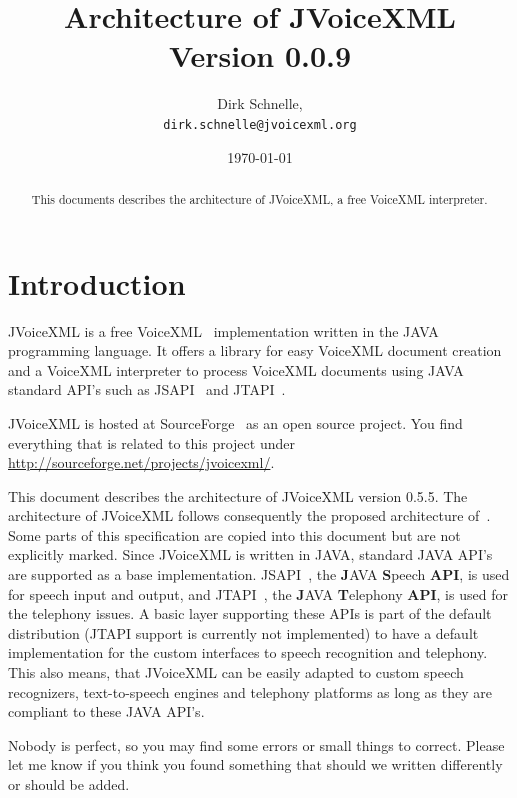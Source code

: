 \documentclass[11pt,a4paper]{article}
\title{Architecture of JVoiceXML \\
Version 0.0.9}
\author{Dirk Schnelle,  \\
  \texttt{dirk.schnelle@jvoicexml.org} }
\date{\today}
\begin{document}
\pagestyle{headings}

\maketitle

\begin{abstract}
This documents describes the architecture of JVoiceXML, a free
VoiceXML interpreter.
\end{abstract}

\tableofcontents

\section{Introduction}
\label{sec:introduction}

JVoiceXML is a free VoiceXML~\cite{w3.org:voicexml} implementation written in 
the JAVA programming language. It offers a library for easy VoiceXML
document creation and a VoiceXML interpreter to process 
VoiceXML documents using JAVA standard API's such as JSAPI~\cite{sun:jsapi} and
JTAPI~\cite{sun:jtapi}.

JVoiceXML is hosted at SourceForge~\cite{sourceforge} as an open source 
project.
You find everything that is related to this project under
\url{http://sourceforge.net/projects/jvoicexml/}.

This document describes the architecture of JVoiceXML version 0.5.5. The
architecture of JVoiceXML follows
consequently the proposed architecture of~\cite{w3.org:voicexml}.
Some parts of this specification are copied into this document
but are not explicitly marked.
Since JVoiceXML is written in JAVA, standard JAVA API's are supported as a base
implementation. JSAPI~\cite{sun:jsapi}, the \textbf{J}AVA \textbf{S}peech
\textbf{API}, is used for speech input and output,
and JTAPI~\cite{sun:jtapi}, the \textbf{J}AVA \textbf{T}elephony \textbf{API}, is used for the 
telephony issues. 
A basic layer supporting these APIs is part of the default distribution (JTAPI
support is currently not implemented) to have a default implementation for the
custom interfaces to speech recognition and telephony. This
also means, that JVoiceXML can be easily adapted to custom speech recognizers,
text-to-speech engines and telephony platforms as long as they
are compliant to these JAVA API's.

Nobody is perfect, so you may find some errors or small things to correct.
Please let me know if you think you found something that should we written
differently or should be added.
\end{document}
